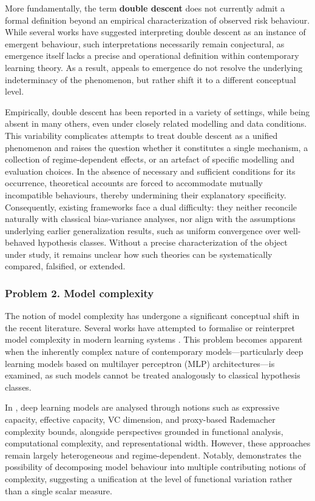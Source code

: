 More fundamentally, the term \textbf{double descent} does not currently admit a formal definition beyond an empirical characterization of observed risk behaviour. While several works have suggested interpreting double descent as an instance of emergent behaviour, such interpretations necessarily remain conjectural, as emergence itself lacks a precise and operational definition within contemporary learning theory. As a result, appeals to emergence do not resolve the underlying indeterminacy of the phenomenon, but rather shift it to a different conceptual level.

Empirically, double descent has been reported in a variety of settings, while being absent in many others, even under closely related modelling and data conditions. This variability complicates attempts to treat double descent as a unified phenomenon and raises the question whether it constitutes a single mechanism, a collection of regime-dependent effects, or an artefact of specific modelling and evaluation choices. In the absence of necessary and sufficient conditions for its occurrence, theoretical accounts are forced to accommodate mutually incompatible behaviours, thereby undermining their explanatory specificity. Consequently, existing frameworks face a dual difficulty: they neither reconcile naturally with classical bias-variance analyses, nor align with the assumptions underlying earlier generalization results, such as uniform convergence over well-behaved hypothesis classes. Without a precise characterization of the object under study, it remains unclear how such theories can be systematically compared, falsified, or extended.

\subsubsection*{Problem 2. Model complexity}
The notion of model complexity has undergone a significant conceptual shift in the recent literature. Several works have attempted to formalise or reinterpret model complexity in modern learning systems \cite{hu2021modelcomplexitydeeplearning,luo2024investigatingimpactmodelcomplexity,barcelo2020modelinterpretabilitylenscomputational,Molnar_2020,janik2021complexitydeepneuralnetworks}. This problem becomes apparent when the inherently complex nature of contemporary models—particularly deep learning models based on multilayer perceptron (MLP) architectures—is examined, as such models cannot be treated analogously to classical hypothesis classes.

In \cite{hu2021modelcomplexitydeeplearning}, deep learning models are analysed through notions such as expressive capacity, effective capacity, VC dimension, and proxy-based Rademacher complexity bounds, alongside perspectives grounded in functional analysis, computational complexity, and representational width. However, these approaches remain largely heterogeneous and regime-dependent. Notably, \cite{Molnar_2020} demonstrates the possibility of decomposing model behaviour into multiple contributing notions of complexity, suggesting a unification at the level of functional variation rather than a single scalar measure.

